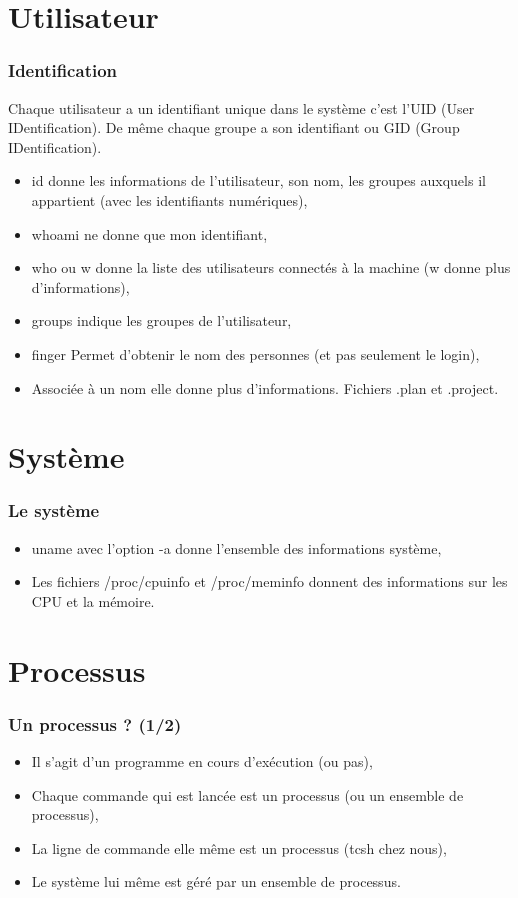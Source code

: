 \documentclass[handout,10pt]{beamer}
\begin{document}
\section{Utilisateur}
\frame
{
    \frametitle{Identification}

    Chaque utilisateur a un identifiant unique dans le système c'est l'UID (User IDentification). De même chaque groupe a son identifiant ou GID (Group IDentification).

    \begin{itemize}
        \item {\ttfamily id} donne les informations de l'utilisateur, son nom, les groupes auxquels il appartient (avec les identifiants numériques),
        \item {\ttfamily whoami} ne donne que mon identifiant,
        \item {\ttfamily who} ou {\ttfamily w} donne la liste des utilisateurs connectés à la machine (w donne plus d'informations),
        \item {\ttfamily groups} indique les groupes de l'utilisateur,
        \item {\ttfamily finger} Permet d'obtenir le nom des personnes (et pas seulement le login),
        \item Associée à un nom elle donne plus d'informations. Fichiers {\ttfamily .plan} et {\ttfamily .project}.
    \end{itemize}
}


\section{Système}
\frame
{
    \frametitle{Le système}

    \begin{itemize}

        \item {\ttfamily uname} avec l'option {\ttfamily -a} donne l'ensemble des informations système,
        \item Les fichiers {\ttfamily /proc/cpuinfo} et {\ttfamily /proc/meminfo} donnent des informations sur les CPU et la mémoire.
    \end{itemize}
}


\section{Processus}
\frame
{
    \frametitle{Un processus ? (1/2)}

    \begin{itemize}
        \item Il s'agit d'un programme en cours d'exécution (ou pas),
        \item Chaque commande qui est lancée est un processus (ou un ensemble de processus),
        \item La ligne de commande elle même est un processus (tcsh chez nous),
        \item Le système lui même est géré par un ensemble de processus.
    \end{itemize}
}
\end{document}

